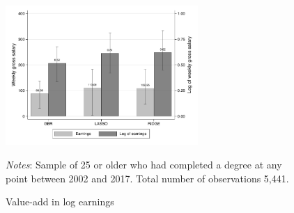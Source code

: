 \documentclass[12pt, a4paper]{article}
\begin{document}
\begin{figure}[H]
\centering
\caption{Value-add in log earnings}
\vspace{0.5cm}
  \label{fig:valadlelog}
    \includegraphics[width=0.65\textwidth]{_figures/valad_levearn_log.pdf}
\parbox{1\textwidth}{\footnotesize{\textit{Notes}: Sample of 25 or older who had completed a degree at any point between 2002 and 2017. Total number of observations 5,441.}}
\end{figure}
%
%
%
\end{document}
